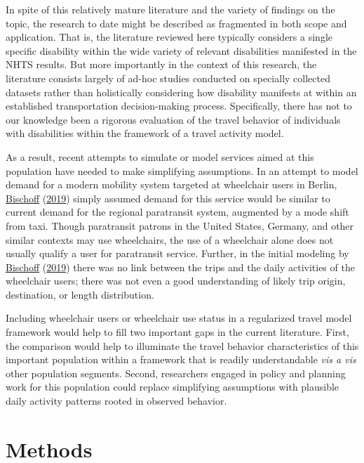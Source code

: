 \documentclass[3p, authoryear, review]{elsarticle} %
\begin{document}
In spite of this relatively mature literature and the variety of findings on the
topic, the research to date might be described as fragmented in both scope and
application. That is, the literature reviewed here typically considers a single
specific disability within the wide variety of relevant disabilities manifested
in the NHTS results. But more importantly in the context of this research, the
literature consists largely of ad-hoc studies conducted on specially
collected datasets rather than holistically considering how disability manifests
at within an established transportation decision-making process. Specifically,
there has not to our knowledge been a rigorous evaluation of the travel behavior
of individuals with disabilities within the framework of a travel activity
model.

As a result, recent attempts to simulate or model services aimed at this
population have needed to make simplifying assumptions. In an attempt to model
demand for a modern mobility system targeted at wheelchair users in Berlin,
\protect\hyperlink{ref-Bischoff2019}{Bischoff} (\protect\hyperlink{ref-Bischoff2019}{2019}) simply assumed demand for this service would be similar to current
demand for the regional paratransit system, augmented by a mode shift from taxi.
Though paratransit patrons in the United States, Germany, and other similar
contexts may use wheelchairs, the use of a wheelchair alone does not usually
qualify a user for paratransit service.
Further, in the initial modeling by \protect\hyperlink{ref-Bischoff2019}{Bischoff} (\protect\hyperlink{ref-Bischoff2019}{2019}) there was no link between the
trips and the daily activities of the wheelchair users; there was not even a
good understanding of likely trip origin, destination, or length distribution.

Including wheelchair users or wheelchair use status in a regularized travel model
framework would help to fill two important gaps in the current literature. First,
the comparison would help to illuminate the travel behavior characteristics of
this important population within a framework that is readily understandable
\emph{vis a vis} other population segments. Second, researchers engaged in
policy and planning work for this population could replace simplifying assumptions
with plausible daily activity patterns rooted in observed behavior.

\hypertarget{methodology}{%
\section{Methods}\label{methodology}}
\end{document}
